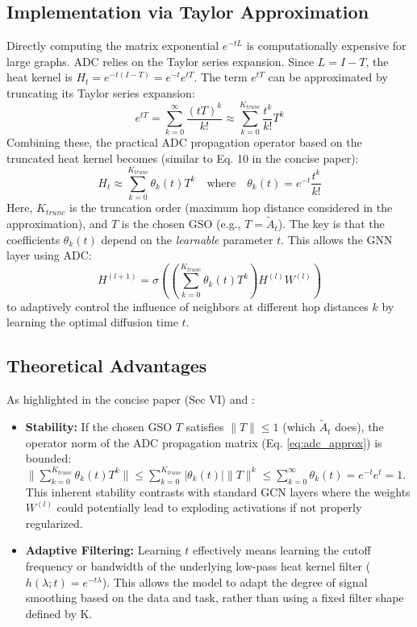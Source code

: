 \subsection{Implementation via Taylor Approximation}
Directly computing the matrix exponential $e^{-tL}$ is computationally expensive for large graphs. ADC relies on the Taylor series expansion. Since $L = I - T$, the heat kernel is $H_t = e^{-t(I-T)} = e^{-t} e^{tT}$. The term $e^{tT}$ can be approximated by truncating its Taylor series expansion:
\begin{equation}
    e^{tT} = \sum_{k=0}^{\infty} \frac{(tT)^k}{k!} \approx \sum_{k=0}^{K_{trunc}} \frac{t^k}{k!} T^k
\end{equation}
Combining these, the practical ADC propagation operator based on the truncated heat kernel becomes (similar to Eq. 10 in the concise paper):
\begin{equation}
    H_t \approx \sum_{k=0}^{K_{trunc}} \theta_k(t) T^k \quad \text{where} \quad \theta_k(t) = e^{-t} \frac{t^k}{k!}
    \label{eq:adc_approx}
\end{equation}
Here, $K_{trunc}$ is the truncation order (maximum hop distance considered in the approximation), and $T$ is the chosen GSO (e.g., $T = \tilde{A}_t$). The key is that the coefficients $\theta_k(t)$ depend on the \textit{learnable} parameter $t$. This allows the GNN layer using ADC:
\begin{equation}
    H^{(l+1)} = \sigma \left( \left( \sum_{k=0}^{K_{trunc}} \theta_k(t) T^k \right) H^{(l)} W^{(l)} \right)
\end{equation}
to adaptively control the influence of neighbors at different hop distances $k$ by learning the optimal diffusion time $t$.

\subsection{Theoretical Advantages}
As highlighted in the concise paper (Sec VI) and \cite{Zhao2021ADC}:
\begin{itemize}
    \item \textbf{Stability:} If the chosen GSO $T$ satisfies $\|T\| \le 1$ (which $\tilde{A}_t$ does), the operator norm of the ADC propagation matrix (Eq. \ref{eq:adc_approx}) is bounded: $\|\sum_{k=0}^{K_{trunc}} \theta_k(t) T^k \| \le \sum_{k=0}^{K_{trunc}} |\theta_k(t)| \|T\|^k \le \sum_{k=0}^{\infty} \theta_k(t) = e^{-t}e^t = 1$. This inherent stability contrasts with standard GCN layers where the weights $W^{(l)}$ could potentially lead to exploding activations if not properly regularized.
    \item \textbf{Adaptive Filtering:} Learning $t$ effectively means learning the cutoff frequency or bandwidth of the underlying low-pass heat kernel filter ($h(\lambda; t)=e^{-t\lambda}$). This allows the model to adapt the degree of signal smoothing based on the data and task, rather than using a fixed filter shape defined by K.
\end{itemize}

